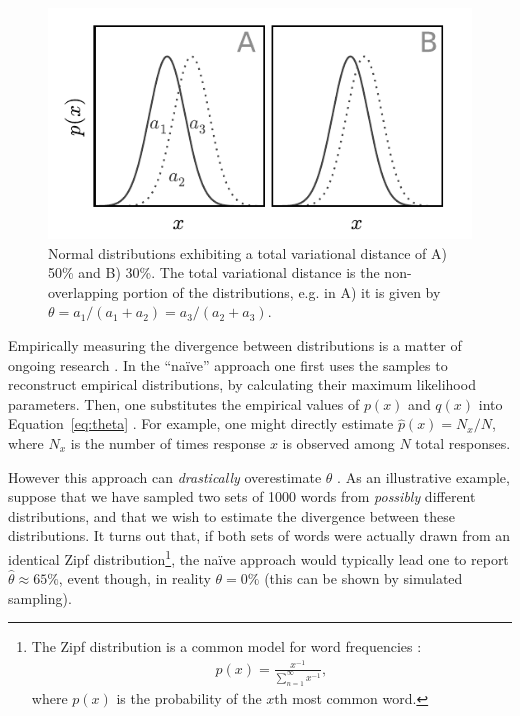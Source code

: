 \documentclass{sigchi}
\begin{document}
\begin{figure}
	\centering
	\includegraphics[scale=1.0]{figs/normal_example.pdf}
	\caption{
	  	Normal distributions exhibiting a total variational distance
		of A) 50\% and B) 30\%.  The total variational distance is 
		the non-overlapping portion of the distributions, e.g. in
		A) it is given by 
		$\theta = a_1 / (a_1 + a_2) = a_3 / (a_2 + a_3)$.
	}
	\label{fig:l1_example}
\end{figure}

Empirically measuring the divergence between distributions
is a matter of ongoing
research \cite{val-thesis,batu2013testing,chan2014optimal}.
In the ``na\"ive'' approach one first uses the samples to reconstruct 
empirical
distributions, by calculating their maximum likelihood parameters.
Then, one substitutes the empirical values of $p(x)$ and $q(x)$ into 
Equation~\ref{eq:theta} \cite{batu2013testing}.  
For example, one might directly estimate $\hat{p}(x) = N_x/N$, 
where $N_x$ is the number of times response $x$ is observed among $N$ 
total responses.

However this approach can \textit{drastically} overestimate $\theta$
\cite{val-thesis}.  As an illustrative example,
suppose that we have sampled two sets of 1000 words from \textit{possibly} 
different distributions, and that we wish to estimate the divergence 
between these distributions.  
It turns out that, if both sets of words were actually drawn from 
an identical Zipf distribution\footnote{The 
  Zipf distribution is a common model for word frequencies 
  \cite{powers1998applications,zipf1949human}:
  \begin{align}
	p(x) = \frac{x^{-1}}{\sum_{n=1}^{\infty}x^{-1}},
	\label{eq:zipf}
  \end{align}
  where $p(x)$ is the probability of the $x$th most common word.
}, the na\"ive approach would typically lead one to report 
$\hat{\theta} \approx 65\%$, event though, in reality $\theta = 0\%$
(this can be shown by simulated sampling).
\end{document}
